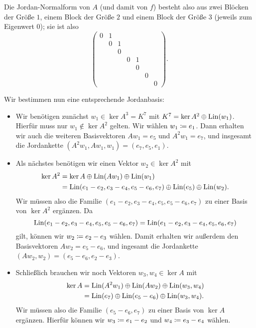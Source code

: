 \documentclass[a4paper,10pt,numbers = noenddot]{scrartcl}
\begin{document}
\begin{example}
  Die Jordan-Normalform von $A$ (und damit von $f$) besteht also aus zwei Blöcken der Größe $1$, einem Block der Größe $2$ und einem Block der Größe $3$ (jeweils zum Eigenwert $0$);
  sie ist also
  \[
    \begin{pmatrix}
      0 & 1 &   &   &   &   &   \\
        & 0 & 1 &   &   &   &   \\
        &   & 0 &   &   &   &   \\
        &   &   & 0 & 1 &   &   \\
        &   &   &   & 0 &   &   \\
        &   &   &   &   & 0 &   \\
        &   &   &   &   &   & 0
    \end{pmatrix}.
  \]

  Wir bestimmen nun eine entsprechende Jordanbasis:
  \begin{itemize}
    \item
      Wir benötigen zunächst $w_1 \in \ker A^3 = K^7$ mit $K^7 = \ker A^2 \oplus \operatorname{Lin}(w_1)$.
      Hierfür muss nur $w_1 \notin \ker A^2$ gelten.
      Wir wählen $w_1 \coloneqq e_1$.
      Dann erhalten wir auch die weiteren Basisvektoren $A w_1 = e_5$ und $A^2 w_1 = e_7$, und insgesamt die Jordankette $(A^2 w_1, A w_1, w_1) = (e_7, e_5, e_1)$.
    \item
      Als nächstes benötigen wir einen Vektor $w_2 \in \ker A^2$ mit
      \begin{align*}
            \ker A^2
        &=          \ker A
            \oplus  \operatorname{Lin}(A w_1)
            \oplus  \operatorname{Lin}(w_1) \\
        &=          \operatorname{Lin}(e_1 - e_2, e_3 - e_4, e_5 - e_6, e_7)
            \oplus  \operatorname{Lin}(e_5)
            \oplus  \operatorname{Lin}(w_2).
      \end{align*}
      Wir müssen also die Familie $( e_1 - e_2, e_3 - e_4, e_5, e_5 - e_6, e_7 )$ zu einer Basis von $\ker A^2$ ergänzen.
      Da
      \[
          \operatorname{Lin}( e_1 - e_2, e_3 - e_4, e_5, e_5 - e_6, e_7 ) \\
        = \operatorname{Lin}( e_1 - e_2, e_3 - e_4, e_5, e_6, e_7 )
      \]
      gilt, können wir $w_2 \coloneqq e_2 - e_3$ wählen.
      Damit erhalten wir außerdem den Basisvektoren $A w_2 = e_5 - e_6$, und ingesamt die Jordankette $(A w_2, w_2) = (e_5 - e_6, e_2 - e_3)$.
    \item
      Schließlich brauchen wir noch Vektoren $w_3, w_4 \in \ker A$ mit
      \begin{align*}
            \ker A
        &=          \operatorname{Lin}(A^2 w_1)
            \oplus  \operatorname{Lin}(A w_2)
            \oplus  \operatorname{Lin}(w_3, w_4)  \\
        &=          \operatorname{Lin}(e_7)
            \oplus  \operatorname{Lin}(e_5 - e_6)
            \oplus  \operatorname{Lin}(w_3, w_4).
      \end{align*}
      Wir müssen also die Familie $(e_5 - e_6, e_7)$ zu einer Basis von $\ker A$ ergänzen.
      Hierfür können wir $w_3 \coloneqq e_1 - e_2$ und $w_4 \coloneqq e_3 - e_4$ wählen.
  \end{itemize}


\end{example}
\end{document}
